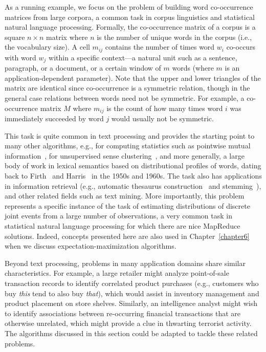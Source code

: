 As a running example, we focus on the problem of building word
co-occurrence matrices from large corpora, a common task in corpus
linguistics and statistical natural language processing.  Formally,
the co-occurrence matrix of a corpus is a square $n \times n$ matrix
where $n$ is the number of unique words in the corpus
(i.e., the vocabulary size).  A cell $m_{ij}$ contains the number of
times word $w_i$ co-occurs with word $w_j$ within a specific
context---a natural unit such as a sentence, paragraph, or a document,
or a certain window of $m$ words (where $m$ is an
application-dependent parameter).  Note that the upper and lower
triangles of the matrix are identical since co-occurrence is a
symmetric relation, though in the general case relations between words
need not be symmetric.  For example, a co-occurrence matrix $M$ where
$m_{ij}$ is the count of how many times word $i$ was immediately
succeeded by word $j$ would usually not be symmetric.

This task is quite common in text processing and provides the starting
point to many other algorithms, e.g., for computing statistics such as
pointwise mutual information~\cite{Church_Hanks_1990}, for
unsupervised sense clustering~\cite{Schutze_CL1998}, and more
generally, a large body of work in lexical semantics based on
distributional profiles of words, dating back to
Firth~\cite{Firth_1957} and Harris~\cite{Harris_1968} in the 1950s and
1960s.  The task also has applications in information retrieval (e.g.,
automatic thesaurus construction~\cite{Schutze_Pedersen_IPM1997} and
stemming~\cite{Xu_Croft_TOIS1998}), and other related fields such as
text mining.  More importantly, this problem represents a specific
instance of the task of estimating distributions of discrete joint
events from a large number of observations, a very common task in
statistical natural language processing for which there are nice
MapReduce solutions.  Indeed, concepts presented here are also used in
Chapter~\ref{chapter6} when we discuss expectation-maximization
algorithms.

Beyond text processing, problems in many application domains share
similar characteristics.  For example, a large retailer might analyze
point-of-sale transaction records to identify correlated product
purchases (e.g., customers who buy {\it this} tend to also buy {\it
  that}), which would assist in inventory management and product
placement on store shelves.  Similarly, an intelligence analyst might
wish to identify associations between re-occurring financial
transactions that are otherwise unrelated, which might provide a clue
in thwarting terrorist activity.  The algorithms discussed in this
section could be adapted to tackle these related problems.

